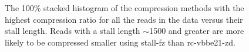 \begin{figure}
\centering

\caption{\label{fig:stall-ratio}The 100\% stacked histogram of the compression
	methods with the highest compression ratio for all the reads in the data
	versus their stall length. Reads with a stall length $\sim$1500 and
	greater are more likely to be compressed smaller using stall-fz than
	rc-vbbe21-zd.}
\end{figure}
